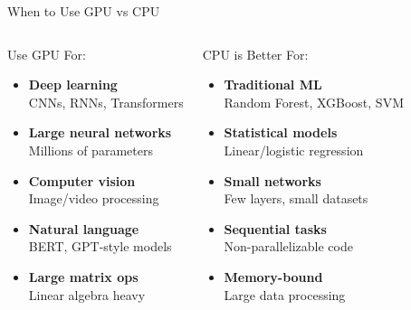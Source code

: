 \documentclass[aspectratio=169]{beamer}
\begin{document}
\begin{frame}{When to Use GPU vs CPU}
\begin{columns}[T]
\begin{block}{Use GPU For:}
\begin{itemize}
    \item \textcolor{accentgreen}{\textbf{Deep learning}}\\
    CNNs, RNNs, Transformers
    \item \textcolor{accentgreen}{\textbf{Large neural networks}}\\
    Millions of parameters
    \item \textcolor{accentgreen}{\textbf{Computer vision}}\\
    Image/video processing
    \item \textcolor{accentgreen}{\textbf{Natural language}}\\
    BERT, GPT-style models
    \item \textcolor{accentgreen}{\textbf{Large matrix ops}}\\
    Linear algebra heavy
\end{itemize}
\end{block}

\begin{alertblock}{CPU is Better For:}
\begin{itemize}
    \item \textcolor{ceciblue}{\textbf{Traditional ML}}\\
    Random Forest, XGBoost, SVM
    \item \textcolor{ceciblue}{\textbf{Statistical models}}\\
    Linear/logistic regression
    \item \textcolor{ceciblue}{\textbf{Small networks}}\\
    Few layers, small datasets
    \item \textcolor{ceciblue}{\textbf{Sequential tasks}}\\
    Non-parallelizable code
    \item \textcolor{ceciblue}{\textbf{Memory-bound}}\\
    Large data processing
\end{itemize}
\end{alertblock}
\end{columns}

\end{frame}

\end{document}
